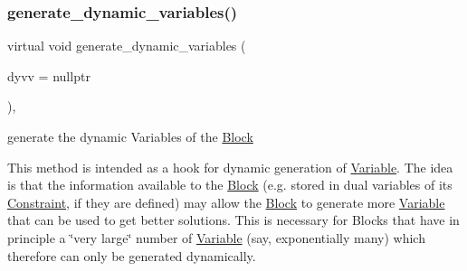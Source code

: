 \subsubsection{\texorpdfstring{generate\+\_\+dynamic\+\_\+variables()}{generate\_dynamic\_variables()}}
{\footnotesize\ttfamily virtual void generate\+\_\+dynamic\+\_\+variables (\begin{DoxyParamCaption}\item[{\mbox{\hyperlink{class_s_m_spp__di__unipi__it_1_1_configuration}{Configuration}} $\ast$}]{dyvv = {\ttfamily nullptr} }\end{DoxyParamCaption})\hspace{0.3cm}{\ttfamily [inline]}, {\ttfamily [virtual]}}



generate the dynamic Variables of the \mbox{\hyperlink{class_s_m_spp__di__unipi__it_1_1_block}{Block}} 

This method is intended as a hook for dynamic generation of \mbox{\hyperlink{class_s_m_spp__di__unipi__it_1_1_variable}{Variable}}. The idea is that the information available to the \mbox{\hyperlink{class_s_m_spp__di__unipi__it_1_1_block}{Block}} (e.\+g. stored in dual variables of its \mbox{\hyperlink{class_s_m_spp__di__unipi__it_1_1_constraint}{Constraint}}, if they are defined) may allow the \mbox{\hyperlink{class_s_m_spp__di__unipi__it_1_1_block}{Block}} to generate more \mbox{\hyperlink{class_s_m_spp__di__unipi__it_1_1_variable}{Variable}} that can be used to get better solutions. This is necessary for Blocks that have in principle a \char`\"{}very large\char`\"{} number of \mbox{\hyperlink{class_s_m_spp__di__unipi__it_1_1_variable}{Variable}} (say, exponentially many) which therefore can only be generated dynamically.

